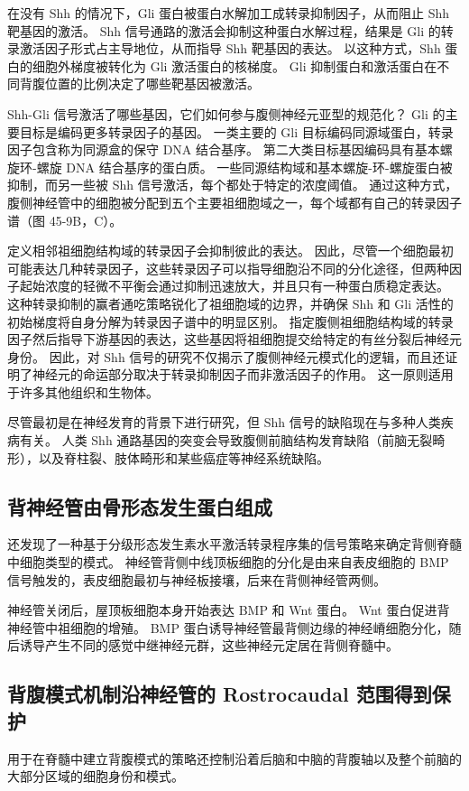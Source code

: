 在没有 Shh 的情况下，Gli 蛋白被蛋白水解加工成转录抑制因子，从而阻止 Shh 靶基因的激活。 Shh 信号通路的激活会抑制这种蛋白水解过程，结果是 Gli 的转录激活因子形式占主导地位，从而指导 Shh 靶基因的表达。 以这种方式，Shh 蛋白的细胞外梯度被转化为 Gli 激活蛋白的核梯度。 Gli 抑制蛋白和激活蛋白在不同背腹位置的比例决定了哪些靶基因被激活。

Shh-Gli 信号激活了哪些基因，它们如何参与腹侧神经元亚型的规范化？ Gli 的主要目标是编码更多转录因子的基因。 一类主要的 Gli 目标编码同源域蛋白，转录因子包含称为同源盒的保守 DNA 结合基序。 第二大类目标基因编码具有基本螺旋环-螺旋 DNA 结合基序的蛋白质。 一些同源结构域和基本螺旋-环-螺旋蛋白被抑制，而另一些被 Shh 信号激活，每个都处于特定的浓度阈值。 通过这种方式，腹侧神经管中的细胞被分配到五个主要祖细胞域之一，每个域都有自己的转录因子谱（图 45-9B，C）。

定义相邻祖细胞结构域的转录因子会抑制彼此的表达。 因此，尽管一个细胞最初可能表达几种转录因子，这些转录因子可以指导细胞沿不同的分化途径，但两种因子起始浓度的轻微不平衡会通过抑制迅速放大，并且只有一种蛋白质稳定表达。 这种转录抑制的赢者通吃策略锐化了祖细胞域的边界，并确保 Shh 和 Gli 活性的初始梯度将自身分解为转录因子谱中的明显区别。 指定腹侧祖细胞结构域的转录因子然后指导下游基因的表达，这些基因将祖细胞提交给特定的有丝分裂后神经元身份。 因此，对 Shh 信号的研究不仅揭示了腹侧神经元模式化的逻辑，而且还证明了神经元的命运部分取决于转录抑制因子而非激活因子的作用。 这一原则适用于许多其他组织和生物体。

尽管最初是在神经发育的背景下进行研究，但 Shh 信号的缺陷现在与多种人类疾病有关。 人类 Shh 通路基因的突变会导致腹侧前脑结构发育缺陷（前脑无裂畸形），以及脊柱裂、肢体畸形和某些癌症等神经系统缺陷。

\subsection{背神经管由骨形态发生蛋白组成}
还发现了一种基于分级形态发生素水平激活转录程序集的信号策略来确定背侧脊髓中细胞类型的模式。 神经管背侧中线顶板细胞的分化是由来自表皮细胞的 BMP 信号触发的，表皮细胞最初与神经板接壤，后来在背侧神经管两侧。

神经管关闭后，屋顶板细胞本身开始表达 BMP 和 Wnt 蛋白。 Wnt 蛋白促进背神经管中祖细胞的增殖。 BMP 蛋白诱导神经管最背侧边缘的神经嵴细胞分化，随后诱导产生不同的感觉中继神经元群，这些神经元定居在背侧脊髓中。

\subsection{背腹模式机制沿神经管的 Rostrocaudal 范围得到保护}
用于在脊髓中建立背腹模式的策略还控制沿着后脑和中脑的背腹轴以及整个前脑的大部分区域的细胞身份和模式。

